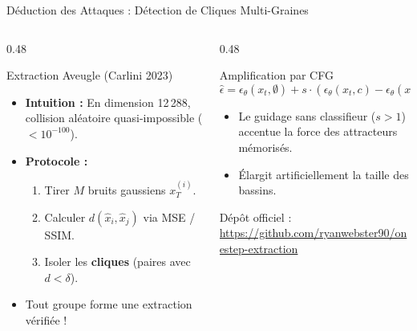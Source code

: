 \documentclass[aspectratio=169, 10pt, table]{beamer}
\begin{document}
\begin{frame}{Déduction des Attaques : Détection de Cliques Multi-Graines}
    \begin{columns}[T]
        \begin{column}{0.48\textwidth}
            \begin{alertblock}{Extraction Aveugle (Carlini 2023)}
                \small
                \begin{itemize}
                    \item \textbf{Intuition :} En dimension 12\,288, collision aléatoire quasi-impossible ($< 10^{-100}$).
                    \item \textbf{Protocole :}
                    \begin{enumerate}
                        \scriptsize
                        \item Tirer $M$ bruits gaussiens $x_T^{(i)}$.
                        \item Calculer $d(\hat{x}_i, \hat{x}_j)$ via MSE / SSIM.
                        \item Isoler les \textbf{cliques} (paires avec $d < \delta$).
                    \end{enumerate}
                    \item Tout groupe forme une extraction vérifiée !
                \end{itemize}
            \end{alertblock}
        \end{column}

        \begin{column}{0.48\textwidth}
            \begin{block}{Amplification par CFG}
                \small
                $$\hat{\epsilon} = \epsilon_\theta(x_t, \emptyset) + s \cdot (\epsilon_\theta(x_t, c) - \epsilon_\theta(x_t, \emptyset))$$
                \begin{itemize}
                    \item Le guidage sans classifieur ($s > 1$) accentue la force des attracteurs mémorisés.
                    \item Élargit artificiellement la taille des bassins.
                \end{itemize}
            \end{block}
            \vspace{0.15cm}
            {\scriptsize Dépôt officiel : \url{https://github.com/ryanwebster90/onestep-extraction}}
        \end{column}
    \end{columns}
\end{frame}
\end{document}
